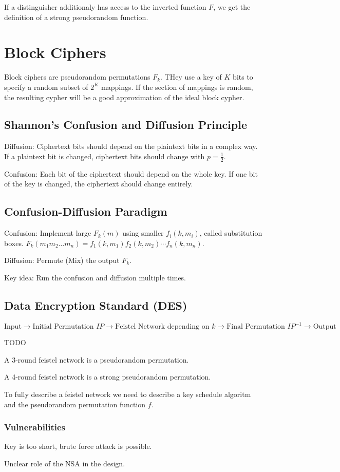 \documentclass[11pt]{article}
\begin{document}
    If a distinguisher additionaly has access to the inverted function $F$, we get the definition of a strong
    pseudorandom function.

    \section{Block Ciphers}

    Block ciphers are pseudorandom permutations $F_k$. THey use a key of $K$ bits to specify a random
    subset of $2^K$ mappings. If the section of mappings is random, the resulting cypher
    will be a good approximation of the ideal block cypher.

    \subsection{Shannon's Confusion and Diffusion Principle}

    Diffusion: Ciphertext bits should depend on the plaintext bits in a complex way.
    If a plaintext bit is changed, ciphertext bits should change with $p=\frac{1}{2}$.

    Confusion: Each bit of the ciphertext should depend on the whole key.
    If one bit of the key is changed, the ciphertext should change entirely.

    \subsection{Confusion-Diffusion Paradigm}

    Confusion: Implement large $F_k(m)$ using smaller $f_i(k, m_i)$, called substitution boxes.
    $F_k(m_1 m_2 \dotsc m_n) = f_1(k, m_1) f_2(k, m_2) \dotsm f_n(k, m_n)$.

    Diffusion: Permute (Mix) the output $F_k$.

    Key idea: Run the confusion and diffusion multiple times.

    \subsection{Data Encryption Standard (DES)}

    $\textrm{Input} \to \textrm{Initial Permutation } IP \to \textrm{Feistel Network depending on } k \to \textrm{Final Permutation } IP^{-1} \to \textrm{Output}$

    TODO

    A 3-round feistel network is a pseudorandom permutation.

    A 4-round feistel network is a strong pseudorandom permutation.

    To fully describe a feistel network we need to describe a key schedule algoritm and the pseudorandom permutation function $f$.

    \subsubsection{Vulnerabilities}

    Key is too short, brute force attack is possible.

    Unclear role of the NSA in the design.
\end{document}
